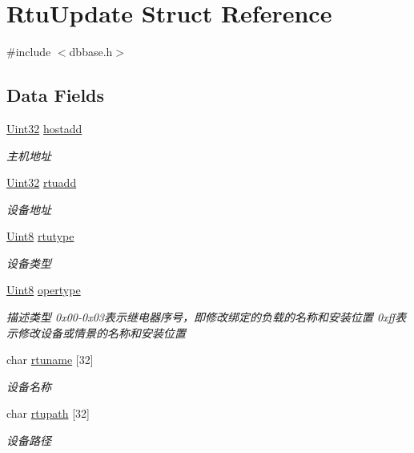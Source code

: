 \hypertarget{structRtuUpdate}{\section{Rtu\-Update Struct Reference}
\label{structRtuUpdate}
}


{\ttfamily \#include $<$dbbase.\-h$>$}

\subsection*{Data Fields}
\begin{DoxyCompactItemize}
\item 
\hyperlink{base_8h_a60cf7b3c038ce37a50796e8eaddf0b5f}{Uint32} \hyperlink{structRtuUpdate_afd4ba90eecfa8e68b0d0acd6f287b7e8}{hostadd}
\begin{DoxyCompactList}\small\item\em 主机地址 \end{DoxyCompactList}\item 
\hyperlink{base_8h_a60cf7b3c038ce37a50796e8eaddf0b5f}{Uint32} \hyperlink{structRtuUpdate_ac51fcd3ef3155b62e54803717d3c86d9}{rtuadd}
\begin{DoxyCompactList}\small\item\em 设备地址 \end{DoxyCompactList}\item 
\hyperlink{base_8h_af84840501dec18061d18a68c162a8fa2}{Uint8} \hyperlink{structRtuUpdate_a6306c766261ee5d3a1ddf6e3fd950c86}{rtutype}
\begin{DoxyCompactList}\small\item\em 设备类型 \end{DoxyCompactList}\item 
\hyperlink{base_8h_af84840501dec18061d18a68c162a8fa2}{Uint8} \hyperlink{structRtuUpdate_ad0145b3406a72cf9cc8182f864ba35c6}{opertype}
\begin{DoxyCompactList}\small\item\em 描述类型 0x00-\/0x03表示继电器序号，即修改绑定的负载的名称和安装位置 0xff表示修改设备或情景的名称和安装位置 \end{DoxyCompactList}\item 
char \hyperlink{structRtuUpdate_a2aa61860c8ea0790ffe6f3e2982757a9}{rtuname} \mbox{[}32\mbox{]}
\begin{DoxyCompactList}\small\item\em 设备名称 \end{DoxyCompactList}\item 
char \hyperlink{structRtuUpdate_a4ff110213c266f79e9ce2fd0fd60c0f1}{rtupath} \mbox{[}32\mbox{]}
\begin{DoxyCompactList}\small\item\em 设备路径 \end{DoxyCompactList}\end{DoxyCompactItemize}


